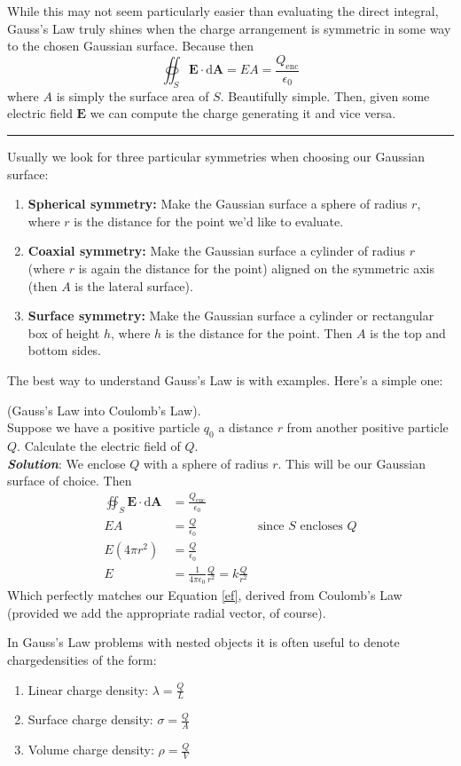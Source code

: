 While this may not seem particularly easier than evaluating the direct integral, Gauss's Law truly shines when the charge arrangement is symmetric in some way to the chosen Gaussian surface. Because then
\[
	\oiint_S \mathbf{E} \cdot \mathrm{d} \mathbf{A} = EA = \frac{Q_{\mathrm{enc} }}{\epsilon_0}
\] 
where $A$ is simply the surface area of $S$. Beautifully simple. Then, given some electric field $\mathbf{E} $ we can compute the charge generating it and vice versa.\\
\hrule 
Usually we look for three particular symmetries when choosing our Gaussian surface:
\begin{enumerate}[label=(\alph*)]
	\item \textbf{Spherical symmetry:} Make the Gaussian surface a sphere of radius $r$, where $r$ is the distance for the point we'd like to evaluate.
	\item \textbf{Coaxial symmetry:} Make the Gaussian surface a cylinder of radius $r$ (where $r$ is again the distance for the point) aligned on the symmetric axis (then $A$ is the lateral surface).
	\item \textbf{Surface symmetry:} 
		Make the Gaussian surface a cylinder or rectangular box of height $h$, where $h$ is the distance for the point. Then $A$ is the top and bottom sides.
\end{enumerate}
The best way to understand Gauss's Law is with examples. Here's a simple one:
\begin{ex}{(Gauss's Law into Coulomb's Law).\\}
Suppose we have a positive particle $q_0$ a distance $r$ from another positive particle $Q$. Calculate the electric field of $Q$.	\\

\textbf{\textit{Solution}}: We enclose $Q$ with a sphere of radius $r$. This will be our Gaussian surface of choice. Then
\begin{align*}
	\oiint_S \mathbf{E} \cdot \mathrm{d} \mathbf{A} &= \frac{Q_{\mathrm{enc} }}{\epsilon_0}\\
	EA &= \frac{Q}{\epsilon_0} &\text{since $S$ encloses $Q$}\\
	E \left( 4\pi r^{2} \right) &= \frac{Q}{\epsilon_0}\\
	E &= \frac{1}{4\pi \epsilon_0}\frac{Q}{r^{2}} = k\frac{Q}{r^{2}} 
\end{align*}
Which perfectly matches our Equation \ref{ef}, derived from Coulomb's Law (provided we add the appropriate radial vector, of course).
\end{ex}
In Gauss's Law problems with nested objects it is often useful to denote chargedensities of the form:
\begin{enumerate}[label=(\alph*)]
	\item Linear charge density: $\lambda = \frac{Q}{L}$ 
	\item Surface charge density: $\sigma = \frac{Q}{A}$ 
	\item Volume charge density: $\rho =  \frac{Q}{V}$
\end{enumerate}

